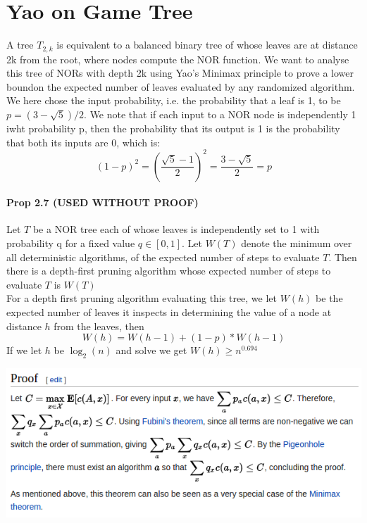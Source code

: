 \documentclass[a4paper, fleqn]{article}
\begin{document}
\section{Yao on Game Tree}
A tree $T_{2,k}$ is equivalent to a balanced binary tree of whose leaves are at distance 2k from the root, where nodes compute the NOR function.
We want to analyse this tree of NORs with depth 2k using Yao's Minimax principle to prove a lower boundon the expected number of leaves evaluated by any randomized algorithm.
We here chose the input probability, i.e. the probability that a leaf is 1, to be $p = (3 - \sqrt{5})/2$. We note that if each input to a NOR node is independently 1 iwht probability p, then the probability that its output is 1 is the probability that both its inputs are 0, which is:
$$
(1 - p)^2 = \left(\frac{\sqrt 5 - 1}{2} \right)^2 = \frac{3-\sqrt{5}}{2} = p
$$
\paragraph{Prop 2.7 (USED WITHOUT PROOF)} Let $T$ be a NOR tree each of whose leaves is independently set to 1 with probability q for a fixed value $q \in [0,1]$. Let $W(T)$ denote the minimum over all deterministic algorithms, of the expected number of steps to evaluate $T$. Then there is a depth-first pruning algorithm whose expected number of steps to evaluate $T$ is $W(T)$\\
For a depth first pruning algorithm evaluating this tree, we let $W(h)$ be the expected number of leaves it inspects in determining the value of a node at distance $h$ from the leaves, then
$$
W(h) = W(h-1) + (1-p) * W(h-1)
$$
If we let $h$ be $\log_2(n)$ and solve we get $W(h) \geq n^{0.694}$
\newpage
\begin{center}
  \includegraphics[scale=0.7]{./notes_2_gametheory_yao.png}
\end{center}

\end{document}
